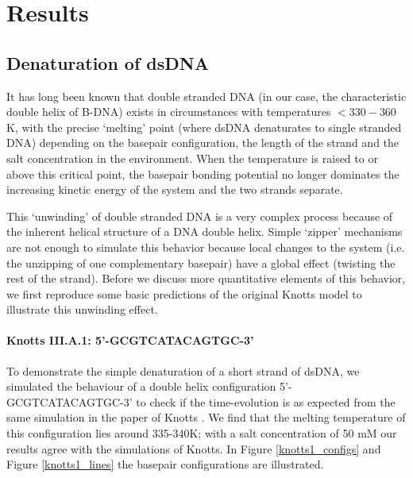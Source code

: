 \section{Results}

\subsection{Denaturation of dsDNA}

It has long been known that double stranded DNA (in our case, the characteristic double helix of B-DNA) exists in circumstances with temperatures $< 330-360$K, with the precise `melting' point (where dsDNA denaturates to single stranded DNA) depending on the basepair configuration, the length of the strand and the salt concentration in the environment. When the temperature is raised to or above this critical point, the basepair bonding potential no longer dominates the increasing kinetic energy of the system and the two strands separate. 

This `unwinding' of double stranded DNA is a very complex process because of the inherent helical structure of a DNA double helix. Simple `zipper' mechanisms are not enough to simulate this behavior because local changes to the system (i.e. the unzipping of one complementary basepair) have a global effect (twisting the rest of the strand). Before we discuss more quantitative elements of this behavior, we first reproduce some basic predictions of the original Knotts \etal model \cite{knotts2007coarse} to illustrate this unwinding effect.

\paragraph{Knotts III.A.1: 5'-GCGTCATACAGTGC-3'} To demonstrate the simple denaturation of a short strand of dsDNA, we simulated the behaviour of a double helix configuration 5'-GCGTCATACAGTGC-3' to check if the time-evolution is as expected from the same simulation in the paper of Knotts \etal \cite{knotts2007coarse}. We find that the melting temperature of this configuration lies around 335-340K; with a salt concentration of 50 mM our results agree with the simulations of Knotts. In Figure \ref{knotts1_configs} and Figure \ref{knotts1_lines} the basepair configurations are illustrated.

